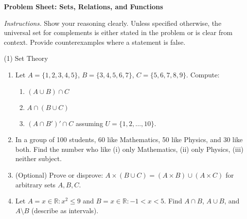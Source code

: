 \documentclass[12pt]{article}
\newcommand{\SheetTitle}{\textbf{Problem Sheet: Sets, Relations, and Functions}}
\newcommand{\CourseInfo}{}
\begin{document}
\begin{tcolorbox}
\centering
{\Large \SheetTitle}
{\small \CourseInfo}
\end{tcolorbox}

\vspace{0.5em}
\noindent\textit{Instructions.} Show your reasoning clearly. Unless specified otherwise, the universal set for complements is either stated in the problem or is clear from context. Provide counterexamples where a statement is false.

\begin{sectbox}{(1) Set Theory}
\begin{enumerate}[label=\textbf{S\arabic*:}]
\item Let $A=\{1,2,3,4,5\}$, $B=\{3,4,5,6,7\}$, $C=\{5,6,7,8,9\}$. Compute:
\begin{enumerate}[label=(\alph*)]
\item $(A\cup B)\cap C$\quad
\item $A\cap (B\cup C)$\quad
\item $(A\cap B')'\cap C$ assuming $U=\{1,2,\dots,10\}$.
\end{enumerate}


\item In a group of 100 students, 60 like Mathematics, 50 like Physics, and 30 like both. Find the number who like (i) only Mathematics, (ii) only Physics, (iii) neither subject.

\item (Optional) Prove or disprove: $A\times(B\cup C)=(A\times B)\cup(A\times C)$ for arbitrary sets $A,B,C$.

\item Let $A={x\in\mathbb{R}:x^2\le 9}$ and $B={x\in\mathbb{R}:-1<x<5}$. Find $A\cap B$, $A\cup B$, and $A\setminus B$ (describe as intervals).
\end{enumerate}
\end{sectbox}
\end{document}
